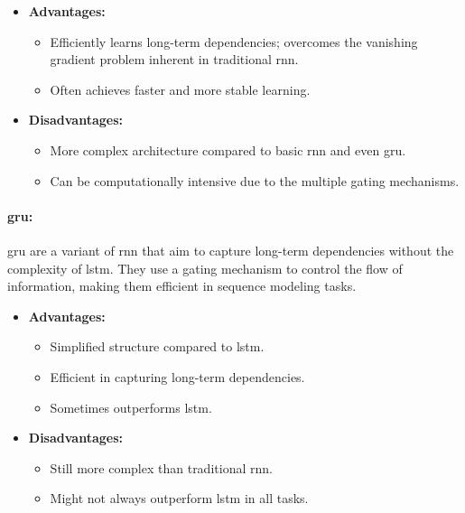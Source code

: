         \begin{itemize}
            \item \textbf{Advantages:}
            \begin{itemize}
                \item Efficiently learns long-term dependencies; overcomes the vanishing gradient problem inherent in traditional \acrshort{rnn}.
                \item Often achieves faster and more stable learning.
            \end{itemize}
            \item \textbf{Disadvantages:}
            \begin{itemize}
                \item More complex architecture compared to basic \acrshort{rnn} and even \acrshort{gru}.
                \item Can be computationally intensive due to the multiple gating mechanisms.
            \end{itemize}
        \end{itemize}

        \paragraph{\acrfull{gru}\cite{chung_empirical_2014}:} \acrshort{gru} are a variant of \acrshort{rnn} that aim to capture long-term dependencies without the complexity of \acrshort{lstm}. They use a gating mechanism to control the flow of information, making them efficient in sequence modeling tasks.

        \begin{itemize}
            \item \textbf{Advantages:} 
            \begin{itemize}
                \item Simplified structure compared to \acrshort{lstm}.
                \item Efficient in capturing long-term dependencies.
                \item Sometimes outperforms \acrshort{lstm}.
            \end{itemize}
            \item \textbf{Disadvantages:} 
            \begin{itemize}
                \item Still more complex than traditional \acrshort{rnn}.
                \item Might not always outperform \acrshort{lstm} in all tasks.
            \end{itemize}
        \end{itemize}
        

